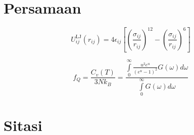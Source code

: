 
\section{Persamaan}

\begin{equation}
  U_{i j}^{\mathrm{LJ}}\left(r_{i j}\right)=4 \epsilon_{i j}\left[\left(\frac{\sigma_{i j}}{r_{i j}}\right)^{12}-\left(\frac{\sigma_{i j}}{r_{i j}}\right)^{6}\right]
\end{equation}

\begin{equation}
  f_{Q}=\frac{C_v(T)}{3Nk_B}=\frac{\displaystyle\int\limits_{0}^{\infty}\frac{u^2e^u}{{(e^u-1)}^2}G(\omega)d\omega}{\displaystyle\int\limits_{0}^{\infty}G(\omega)d\omega}
\end{equation}

\section{Sitasi}
